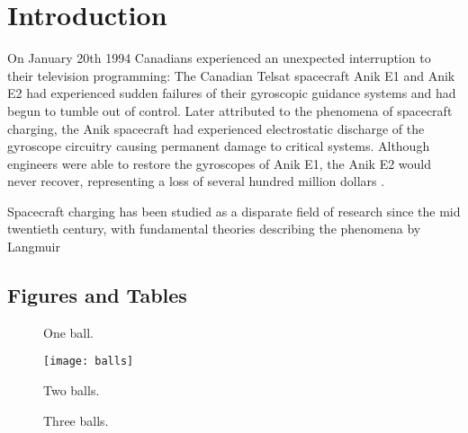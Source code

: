 \chapter{Introduction}
\label{sec:intro}

On January 20th 1994 Canadians experienced an unexpected interruption to their television programming: The Canadian Telsat spacecraft Anik E1 and Anik E2 had experienced sudden failures of their gyroscopic guidance systems and had begun to tumble out of control. Later attributed to the phenomena of spacecraft charging, the Anik spacecraft had experienced electrostatic discharge of the gyroscope circuitry causing permanent damage to critical systems. Although engineers were able to restore the gyroscopes of Anik E1, the Anik E2 would never recover, representing a loss of several hundred million dollars .

Spacecraft charging has been studied as a disparate field of research since the mid twentieth century, with fundamental theories describing the phenomena by Langmuir  


\parencite{Garrett1981} 





\section{Figures and Tables}

\begin{figure}[htbp]
    \centering
    
    \caption[One ball]{One ball.}
\end{figure}

\begin{figure}[thbp]
    \centering
    \texttt{[image: balls]}
    \caption[Two balls]{Two balls.}
\end{figure}

\begin{figure}[hbp]
    \centering
    \caption[Three balls]{Three balls.}
\end{figure}

\kant[5-6] %




